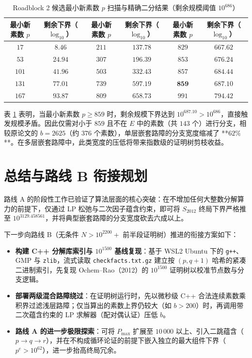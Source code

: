 \documentclass[11pt, a4paper]{article}
\begin{document}
\begin{table}[htbp]
\centering
\caption{Roadblock 2 候选最小新素数 $p$ 扫描与精确二分结果（剩余规模阈值 $10^{686}$）}
\label{tab:rb2}
\begin{tabular}{@{}cc|cc|cc@{}}
\toprule
最小新素数 $p$ & 剩余下界（$\log_{10}$） & 最小新素数 $p$ & 剩余下界（$\log_{10}$） & 最小新素数 $p$ & 剩余下界（$\log_{10}$） \\
\midrule
$17$ & $8.46$ & $211$ & $137.78$ & $829$ & $667.62$ \\
$53$ & $24.94$ & $307$ & $196.39$ & $853$ & $676.24$ \\
$101$ & $41.96$ & $503$ & $332.43$ & $857$ & $684.44$ \\
$131$ & $77.01$ & $739$ & $597.19$ & $\mathbf{859}$ & $\mathbf{687.10}$ \\
$167$ & $93.87$ & $809$ & $658.73$ & $991$ & $794.42$ \\
\bottomrule
\end{tabular}
\end{table}

表 \ref{tab:rb2} 表明，当最小新素数 $p \ge 859$ 时，剩余规模下界达到 $10^{687.10} > 10^{686}$，直接触发规模矛盾。因此仅需对小于 $859$ 且不在 $E$ 中的素数（共 $143$ 个）进行分支，相较原论文的 $b = 2625$（约 $376$ 个素数），单层嵌套路障的分支宽度缩减了 **$62\%$**。在多层嵌套路障中，此类宽度的压低将带来指数级的证明树剪枝收益。

\section{总结与路线 B 衔接规划}

路线 A 的阶段性工作已验证了算法层面的核心突破：在不增加任何大整数分解算力的前提下，仅通过 LP 松弛与二次因子蕴含约束，即可将 $S_{2012}$ 终局下界严格推至 $10^{3129.458561}$，并将典型嵌套路障的分支宽度砍去六成以上。

下一步向路线 B（无条件 $N > 10^{2200}+$ 前半段证明树）推进的衔接方案如下：
\begin{itemize}
    \item \textbf{构建 C++ 分解库索引与 $10^{1500}$ 基线复现}：基于 WSL2 Ubuntu 下的 \texttt{g++}、GMP 与 \texttt{zlib}，流式读取 \texttt{checkfacts.txt.gz} 建立按 $(p, q+1)$ 哈希的紧凑二进制索引，先复现 Ochem–Rao（2012）的 $10^{1500}$ 证明树以校准节点数与分支逻辑。
    \item \textbf{部署两级混合路障绕过}：在证明树运行时，先以微秒级 C++ 合法连续素数乘积界过滤浅层路障；仅当算出的素数上界仍较大（如 $b > 200$）时，再调用带二次蕴含约束的 LP 求解器（配对偶认证）压低 $b$。
    \item \textbf{路线 A 的进一步极限探索}：可将 $P_{\max}$ 扩展至 $10\,000$ 以上、引入二跳蕴含（$p \to q \to r$），并在不构成循环论证的前提下嵌入独立的最大组件下界（$p^e > 10^{62}$），进一步抬高终局冗余。
\end{itemize}
\end{document}
